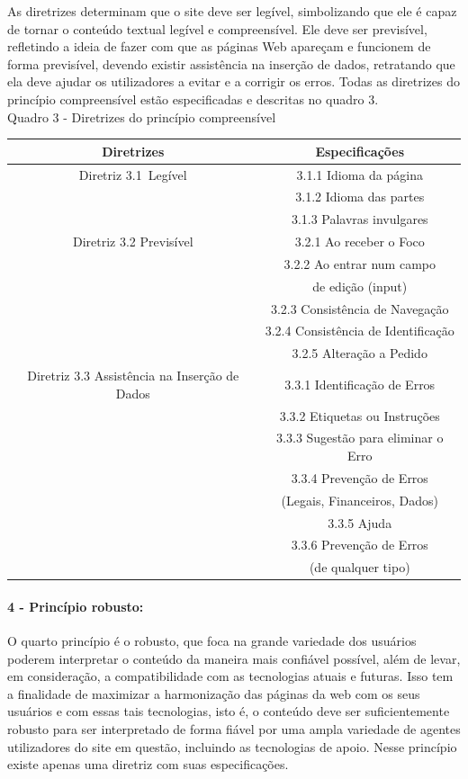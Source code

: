 \documentclass[a4paper]{article}
\begin{document}
\begin{titlepage}
As diretrizes determinam que o site deve ser legível, simbolizando que ele é capaz de tornar o conteúdo textual legível e compreensível. Ele deve ser previsível, refletindo a ideia de fazer com que as páginas Web apareçam e funcionem de forma previsível, devendo existir assistência na inserção de dados, retratando que ela deve ajudar os utilizadores a evitar e a corrigir os erros. Todas as diretrizes do princípio compreensível estão especificadas e descritas no quadro 3.\\

Quadro 3 - Diretrizes do princípio compreensível\\[-1cm]
\begin{center}
	\begin{longtable}{|c|c|}
		\hline
		Diretrizes & Especificações \\
		\hline
		Diretriz 3.1 Legível& 3.1.1 Idioma da página\\
		& 3.1.2 Idioma das partes\\
		& 3.1.3 Palavras invulgares\\
		\hline
		Diretriz 3.2 Previsível & 3.2.1 Ao receber o Foco\\
		& 3.2.2 Ao entrar num campo\\
		& de edição (input)\\
		& 3.2.3 Consistência de Navegação\\
		& 3.2.4 Consistência de Identificação\\
		& 3.2.5 Alteração a Pedido\\
		\hline
		Diretriz 3.3 Assistência na Inserção de Dados& 3.3.1 Identificação de Erros\\
		& 3.3.2 Etiquetas ou Instruções\\
		& 3.3.3 Sugestão para eliminar o Erro\\
		& 3.3.4 Prevenção de Erros\\
		& (Legais, Financeiros, Dados)\\
		& 3.3.5 Ajuda\\
		& 3.3.6 Prevenção de Erros\\
		& (de qualquer tipo)\\
		\hline
	\end{longtable}
\end{center}

\paragraph{4 - Princípio robusto: }

O quarto princípio é o robusto, que foca na grande variedade dos usuários poderem interpretar o conteúdo da maneira mais confiável possível, além de levar, em consideração, a compatibilidade com as tecnologias atuais e futuras. Isso tem a finalidade de maximizar a harmonização das páginas da web com os seus usuários e com essas tais tecnologias, isto é, o conteúdo deve ser suficientemente robusto para ser interpretado de forma fiável por uma ampla variedade de agentes utilizadores do site em questão, incluindo as tecnologias de apoio. Nesse princípio existe apenas uma diretriz com suas especificações.


\end{titlepage}
\end{document}
